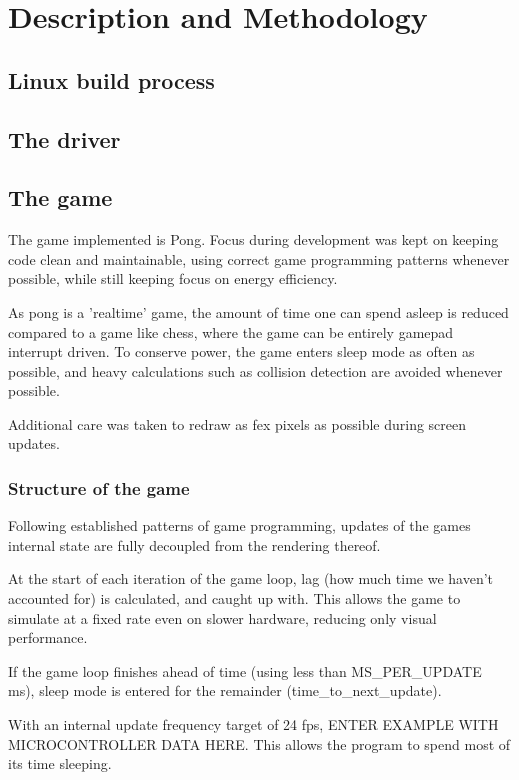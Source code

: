 \section{Description and Methodology}

\subsection{Linux build process}

\subsection{The driver}

\subsection{The game}

The game implemented is Pong. Focus during development was kept on keeping code
clean and maintainable, using correct game programming patterns whenever possible,
while still keeping focus on energy efficiency.

As pong is a 'realtime' game, the amount of time one can spend asleep is reduced
compared to a game like chess, where the game can be entirely gamepad interrupt driven.
To conserve power, the game enters sleep mode as often as possible, and
heavy calculations such as collision detection are avoided whenever possible.

Additional care was taken to redraw as fex pixels as possible during screen updates.

\subsubsection{Structure of the game}

Following established patterns of game programming,
updates of the games internal state are fully decoupled from the rendering thereof.

At the start of each iteration of the game loop,
lag (how much time we haven't accounted for) is calculated, and caught up with.
This allows the game to simulate at a fixed rate even on slower hardware,
reducing only visual performance.

If the game loop finishes ahead of time (using less than MS\_PER\_UPDATE ms),
sleep mode is entered for the remainder (time\_to\_next\_update).

With an internal update frequency target of 24 fps,
ENTER EXAMPLE WITH MICROCONTROLLER DATA HERE.
This allows the program to spend most of its time sleeping.

